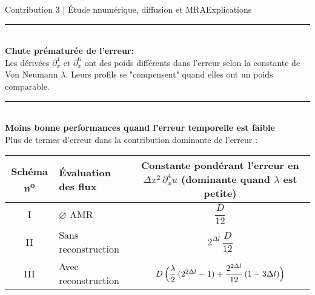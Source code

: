 \begin{frame}{Contribution 3 | Étude nnumérique, diffusion et MRA}{Explications}
    \noindent\color{Primary}\rule{\linewidth}{0.6pt}\color{black}\\
        \textbf{Chute prématurée de l'erreur: }\\
        Les dérivées $\partial_x^{4}$ et  $\partial_x^{6}$ ont des poids différents dans l’erreur selon la constante de Von Neumann $\lambda$.
        Leurs profils se "compensent" quand elles ont un poids comparable.
    \noindent\color{Primary}\rule{\linewidth}{0.6pt}\color{black}\\
        \textbf{Moins bonne performances quand l'erreur temporelle est faible}\\
            Plus de termes d'erreur dans la contribution dominante de l'erreur : 
            \begin{center}
                \renewcommand{\arraystretch}{1}
                \begin{tabular}{@{}clc@{}}
                    \toprule
                    \textbf{Schéma n\textsuperscript{o}} & \textbf{Évaluation des flux} &
                    \makecell[c]{\textbf{Constante pondérant l'erreur en $\Delta x^{2}\,\partial_{x}^{4}u$}\\
                                \textbf{(dominante quand $\lambda$ est petite)}} \\
                    \midrule
                    I   & $\varnothing$ AMR          & $\dfrac{D}{12}$ \\[1mm]
                    II  & Sans reconstruction         & $2^{\Delta l}\,\dfrac{D}{12}$ \\[1mm]
                    III & Avec reconstruction         &
                        $D\,\Bigl(\dfrac{\lambda}{2}\,(2^{2\Delta l}-1)
                        + \dfrac{2^{2\Delta l}}{12}\,(1-3\Delta l)\Bigr)$ \\[1mm]
                    \bottomrule
                \end{tabular}
            \end{center}
\end{frame}